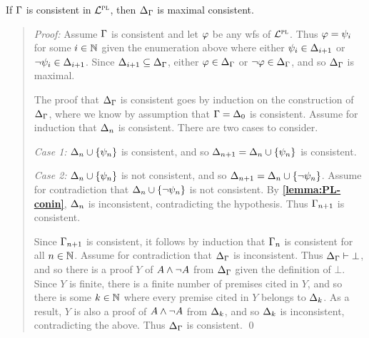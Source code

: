 \begin{Lthm} \label{lemma:PL-max}
  If $\Gamma$ is consistent in $\mathcal{L}^{\textsc{pl}}$, then $\Delta_{\Gamma}$ is maximal consistent. 
\end{Lthm} \vspace{-.2in}

\begin{quote} 
  \textit{Proof:} 
  Assume $\Gamma$ is consistent and let $\varphi$ be any wfs of $\mathcal{L}^{\textsc{pl}}$.
  Thus $\varphi=\psi_i$ for some $i\in\mathbb{N}$ given the enumeration above where either $\psi_i\in\Delta_{i+1}$ or $\neg\psi_i\in\Delta_{i+1}$.
  Since $\Delta_{i+1}\subseteq\Delta_{\Gamma}$, either $\varphi\in\Delta_{\Gamma}$ or $\neg\varphi\in\Delta_{\Gamma}$, and so $\Delta_{\Gamma}$ is maximal.

  The proof that $\Delta_{\Gamma}$ is consistent goes by induction on the construction of $\Delta_{\Gamma}$, where we know by assumption that $\Gamma=\Delta_0$ is consistent. 
  Assume for induction that $\Delta_n$ is consistent. 
  There are two cases to consider.

  \textit{Case 1:} $\Delta_n\cup\lbrace\psi_n\rbrace$ is consistent, and so $\Delta_{n+1}=\Delta_n\cup\lbrace\psi_n\rbrace$ is consistent. 

  \textit{Case 2:} $\Delta_n\cup\lbrace\psi_n\rbrace$ is not consistent, and so $\Delta_{n+1}=\Delta_n\cup\lbrace\neg\psi_n\rbrace$. 
  Assume for contradiction that $\Delta_n\cup\lbrace\neg\psi_n\rbrace$ is not consistent. 
  By \textbf{\ref{lemma:PL-conin}}, $\Delta_n$ is inconsistent, contradicting the hypothesis. 
  Thus $\Gamma_{n+1}$ is consistent. 

  Since $\Gamma_{n+1}$ is consistent, it follows by induction that $\Gamma_n$ is consistent for all $n\in\mathbb{N}$.
  Assume for contradiction that $\Delta_{\Gamma}$ is inconsistent.
  Thus $\Delta_{\Gamma}\vdash \bot$, and so there is a proof $Y$ of $A\wedge\neg A$ from $\Delta_{\Gamma}$ given the definition of $\bot$. 
  Since $Y$ is finite, there is a finite number of premises cited in $Y$, and so there is some $k\in\mathbb{N}$ where every premise cited in $Y$ belongs to $\Delta_k$.
  As a result, $Y$ is also a proof of $A\wedge\neg A$ from $\Delta_k$, and so $\Delta_k$ is inconsistent, contradicting the above. 
  Thus $\Delta_{\Gamma}$ is consistent. 
  \qed
\end{quote}




